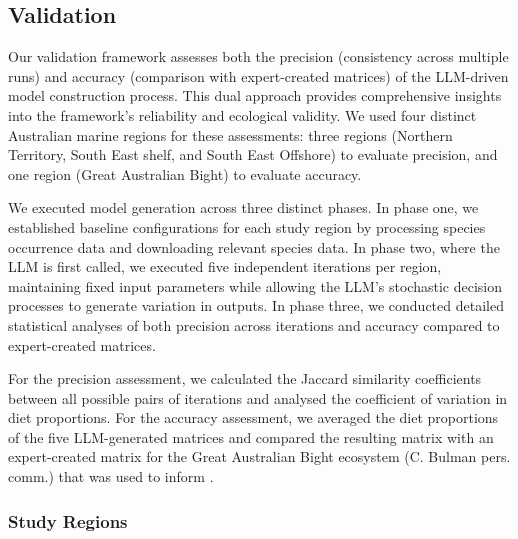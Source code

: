 \subsection{Validation}

Our validation framework assesses both the precision (consistency across multiple runs) and accuracy (comparison with expert-created matrices) of the LLM-driven model construction process. This dual approach provides comprehensive insights into the framework's reliability and ecological validity. We used four distinct Australian marine regions for these assessments: three regions (Northern Territory, South East shelf, and South East Offshore) to evaluate precision, and one region (Great Australian Bight) to evaluate accuracy.

We executed model generation across three distinct phases. In phase one, we established baseline configurations for each study region by processing species occurrence data and downloading relevant species data. In phase two, where the LLM is first called, we executed five independent iterations per region, maintaining fixed input parameters while allowing the LLM's stochastic decision processes to generate variation in outputs. In phase three, we conducted detailed statistical analyses of both precision across iterations and accuracy compared to expert-created matrices.

For the precision assessment, we calculated the Jaccard similarity coefficients between all possible pairs of iterations and analysed the coefficient of variation in diet proportions. For the accuracy assessment, we averaged the diet proportions of the five LLM-generated matrices and compared the resulting matrix with an expert-created matrix for the Great Australian Bight ecosystem (C. Bulman pers. comm.) that was used to inform \citep{Fulton2018}.

\subsubsection{Study Regions}


